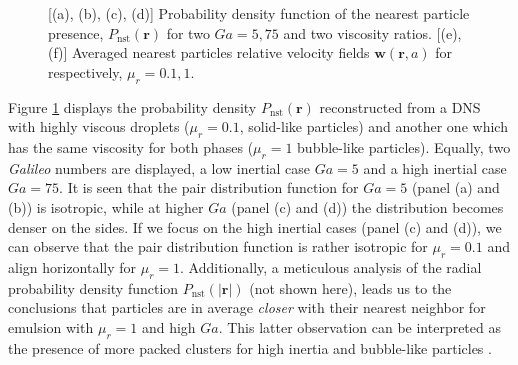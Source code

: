 \documentclass[9pt,a4paper]{article}
\begin{document}
\begin{figure}
    \caption{[(a), (b), (c), (d)] Probability density function of the nearest particle presence, $P_\text{nst}(\textbf{r})$ for two $Ga=5,75$ and two viscosity ratios.
    [(e), (f)] Averaged nearest particles relative velocity fields $\textbf{w}(\textbf{r},a)$ for respectively, $\mu_r = 0.1, 1$. 
     }
    \label{fig:icmf}
\end{figure}
Figure \ref{fig:icmf} displays the probability density $P_\text{nst}(\textbf{r})$ reconstructed from a DNS with highly viscous droplets ($\mu_r=0.1$, solid-like particles) and another one which has the same viscosity for both phases ($\mu_r=1$ bubble-like particles). 
Equally, two \textit{Galileo} numbers are displayed, a low inertial case $Ga=5$ and a high inertial case $Ga=75$. 
It is seen that the pair distribution function for $Ga = 5$ (panel (a) and (b)) is isotropic, while at higher $Ga$ (panel (c) and (d)) the distribution becomes denser on the sides. 
If we focus on the high inertial cases (panel (c) and (d)), we can observe that the pair distribution function is rather isotropic for $\mu_r = 0.1$ and align horizontally for $\mu_r = 1$. 
Additionally, a meticulous analysis of the radial probability density function $P_\text{nst}(|\textbf{r}|)$ (not shown here), leads us to the conclusions that particles are in average \textit{closer} with their nearest neighbor for emulsion with $\mu_r =1$ and high $Ga$. 
This latter observation can be interpreted as the presence of more packed clusters for high inertia and bubble-like particles \cite{zhang2023evolution}. 
\end{document}
